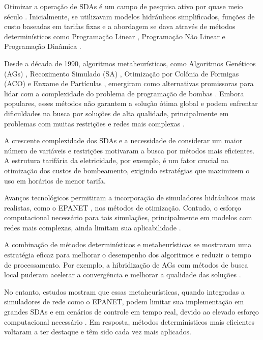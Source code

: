 \documentclass[12pt,a4paper,oneside,linenumbers=off,latinmodern=off,timesnews=off,english,spanish]{rctart-class/rctart}
\begin{document}
Otimizar a operação de SDAs é um campo de pesquisa ativo por quase meio século \cite{MalaJetmarova2017}. Inicialmente, se utilizavam modelos hidráulicos simplificados, funções de custo baseadas em tarifas fixas \cite{MalaJetmarova2017} e a abordagem se dava através de métodos determinísticos como Programação Linear \cite{jowitt1992optimal}, Programação Não Linear \cite{chase1993computer} e Programação Dinâmica \cite{Nitivattananon1996, sterling1975dynamic, zessler1989optimal}.

Desde a década de 1990, algoritmos metaheurísticos, como Algoritmos Genéticos (AGs) \cite{Mackle1995, vanZyl2004, savic1997multiobjective}, Recozimento Simulado (SA) \cite{goldman1999application,teegavarapu2002optimal}, Otimização por Colônia de Formigas (ACO) \cite{lopez2008ant} e Enxame de Partículas \cite{ostadrahimi2012multi}, emergiram como alternativas promissoras para lidar com a complexidade do problema de programação de bombas \cite{MalaJetmarova2017}. Embora populares, esses métodos não garantem a solução ótima global e podem enfrentar dificuldades na busca por soluções de alta qualidade, principalmente em problemas com muitas restrições e redes mais complexas \cite{Costa2015}.

A crescente complexidade dos SDAs e a necessidade de considerar um maior número de variáveis e restrições motivaram a busca por métodos mais eficientes. A estrutura tarifária da eletricidade, por exemplo, é um fator crucial na otimização dos custos de bombeamento, exigindo estratégias que maximizem o uso em horários de menor tarifa.

Avanços tecnológicos permitiram a incorporação de simuladores hidráulicos mais realistas, como o EPANET \cite{epanet}, nos métodos de otimização. Contudo, o esforço computacional necessário para tais simulações, principalmente em modelos com redes mais complexas, ainda limitam sua aplicabilidade \cite{MalaJetmarova2017}. %

A combinação de métodos determinísticos e metaheurísticas se mostraram uma estratégia eficaz para melhorar o desempenho dos algoritmos e reduzir o tempo de processamento. Por exemplo, a hibridização de AGs com métodos de busca local puderam acelerar a convergência e melhorar a qualidade das soluções \cite{reis2006water, vanZyl2004}.

No entanto, estudos mostram que essas metaheurísticas, quando integradas a simuladores de rede como o EPANET, podem limitar sua implementação em grandes SDAs e em cenários de controle em tempo real, devido ao elevado esforço computacional necessário \cite{MalaJetmarova2017}. Em resposta, métodos determinísticos mais eficientes voltaram a ter destaque e têm sido cada vez mais aplicados.
\end{document}
